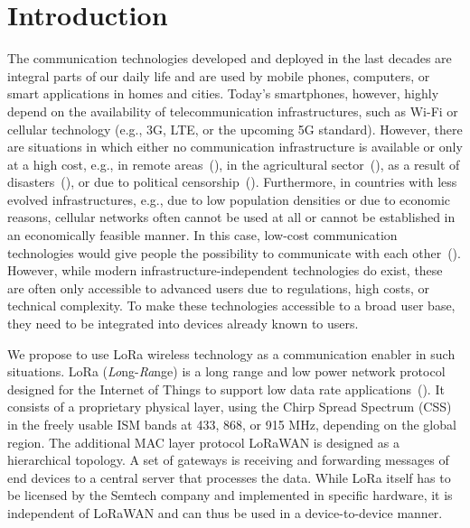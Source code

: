 \section{Introduction}
\label{sec:intro}

The communication technologies developed and deployed in the last decades are integral parts of our daily life and are used by mobile phones, computers, or smart applications in homes and cities.
Today's smartphones, however, highly depend on the availability of telecommunication infrastructures, such as Wi-Fi or cellular technology (e.g., 3G, LTE, or the upcoming 5G standard).
However, there are situations in which either no communication infrastructure is available or only at a high cost, e.g., in remote areas~(\cite{gardner2011serval}), in the agricultural sector~(\cite{elijah2018overview}), as a result of disasters~(\cite{manoj2007communication}), or due to political censorship~(\cite{liu2015performance}).
Furthermore, in countries with less evolved infrastructures, e.g., due to low population densities or due to economic reasons, cellular networks often cannot be used at all or cannot be established in an economically feasible manner. In this case,
low-cost communication technologies would give people the possibility to communicate with each other~(\cite{kayisire2016ict}).
However, while modern infrastructure-independent technologies do exist, these are often only accessible to advanced users due to regulations, high costs, or technical complexity.
To make these technologies accessible to a broad user base, they need to be integrated into devices already known to users.

We propose to use LoRa 
wireless technology as a communication enabler in such situations.
LoRa (\emph{Lo}ng-\emph{Ra}nge) is a
long range and low power network protocol designed for the Internet of Things to support low data rate applications~(\cite{hornbuckle2010fractional}). 
It consists of a proprietary physical layer, using the Chirp Spread Spectrum (CSS) in the freely usable ISM bands at 433, 868, or 915 MHz, depending on the global region.
The additional MAC layer protocol LoRaWAN is designed as a hierarchical topology. 
A set of gateways is receiving and forwarding messages of end devices to a central server that processes the data.
While LoRa itself has to be licensed by the Semtech company and implemented in specific hardware, it is independent of LoRaWAN and can thus be used in a device-to-device manner.

